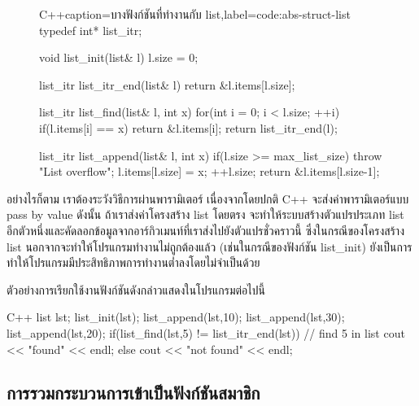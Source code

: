 \begin{figure}
\latintext
\begin{codelist}{C++}{caption={\thaitext บาง{\wbr}ฟังก์ชัน{\wbr}ที่ทำงาน{\wbr}กับ {\ct list}\latintext},label=code:abs-struct-list}
typedef int* list_itr;

void list_init(list& l)
{
  l.size = 0;
}

list_itr list_itr_end(list& l)
{
  return &l.items[l.size];
}

list_itr list_find(list& l, int x)
{
  for(int i = 0; i < l.size; ++i)
    if(l.items[i] == x)
      return &l.items[i];
  return list_itr_end(l);
}

list_itr list_append(list& l, int x)
{
  if(l.size >= max_list_size)
    throw "List overflow";
  l.items[l.size] = x;
  ++l.size;
  return &l.items[l.size-1];
}
\end{codelist}
\thaitext
\end{figure}

อย่างไรก็ตาม เรา{\wbr}ต้อง{\wbr}ระวัง{\wbr}วิธีการ{\wbr}ผ่าน{\wbr}พารามิเตอร์ เนื่องจาก{\wbr}โดย{\wbr}ปกติ C++
จะ{\wbr}ส่ง{\wbr}ค่า{\wbr}พารามิเตอร์{\wbr}แบบ pass by value ดังนั้น ถ้า{\wbr}เรา{\wbr}ส่ง{\wbr}ค่า{\wbr}โครงสร้าง {\ct list}
โดย{\wbr}ตรง จะ{\wbr}ทำ{\wbr}ให้{\wbr}ระบบ{\wbr}สร้าง{\wbr}ตัวแปร{\wbr}ประเภท {\ct list}
อีก{\wbr}ตัว{\wbr}หนึ่ง{\wbr}และ{\wbr}คัดลอก{\wbr}ข้อมูล{\wbr}จาก{\wbr}อาร์กิวเมนท์{\wbr}ที่{\wbr}เรา{\wbr}ส่ง{\wbr}ไป{\wbr}ยัง{\wbr}ตัวแปร{\wbr}ชั่ว{\wbr}คราวนี้{\wbr}
ซึ่ง{\wbr}ใน{\wbr}กรณี{\wbr}ของ{\wbr}โครงสร้าง {\ct list} นอกจาก{\wbr}จะ{\wbr}ทำ{\wbr}ให้{\wbr}โปรแกรม{\wbr}ทำงาน{\wbr}ไม่{\wbr}ถูกต้อง{\wbr}แล้ว{\wbr}
(เช่น{\wbr}ใน{\wbr}กรณี{\wbr}ของ{\wbr}ฟังก์ชัน {\ct list\_init})
ยัง{\wbr}เป็น{\wbr}การ{\wbr}ทำ{\wbr}ให้{\wbr}โปรแกรม{\wbr}มี{\wbr}ประสิทธิภาพ{\wbr}การ{\wbr}ทำงาน{\wbr}ต่ำ{\wbr}ลง{\wbr}โดย{\wbr}ไม่{\wbr}จำเป็น{\wbr}ด้วย{\wbr}

ตัวอย่าง{\wbr}การ{\wbr}เรียก{\wbr}ใช้{\wbr}งาน{\wbr}ฟังก์ชัน{\wbr}ดังกล่าว{\wbr}แสดง{\wbr}ใน{\wbr}โปรแกรม{\wbr}ต่อไปนี้{\wbr}

\latintext
\begin{codelist}{C++}{}
  list lst;
  list_init(lst);
  list_append(lst,10);  list_append(lst,30);  list_append(lst,20);
  if(list_find(lst,5) != list_itr_end(lst))  // find 5 in list
    cout << "found" << endl;
  else
    cout << "not found" << endl;
\end{codelist}
\thaitext

\subsection{การ{\wbr}รวม{\wbr}กระบวนการ{\wbr}เข้า{\wbr}เป็น{\wbr}ฟังก์ชัน{\wbr}สมาชิก} 

